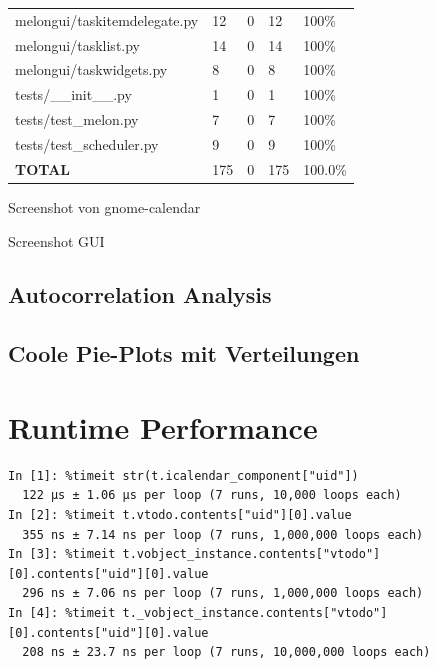 \documentclass{prettytex/ox/mmsc-special-topic}
\begin{document}
\begin{table}[H]
\begin{tabular}{lllll}
      melongui/taskitemdelegate.py    & 12        & 0        & 12        & 100\%     \\
      melongui/tasklist.py            & 14        & 0        & 14        & 100\%     \\
      melongui/taskwidgets.py         & 8         & 0        & 8         & 100\%     \\
      tests/\_\_init\_\_.py           & 1         & 0        & 1         & 100\%     \\
      tests/test\_melon.py            & 7         & 0        & 7         & 100\%     \\
      tests/test\_scheduler.py        & 9         & 0        & 9         & 100\%     \\
      \hline
      \bf TOTAL                       & 175       & 0        & 175       & 100.0\%   \\
      \hline
    \end{tabular}
  \end{table}

  Screenshot von gnome-calendar

  Screenshot GUI

  \subsection{Autocorrelation Analysis}
  \subsection{Coole Pie-Plots mit Verteilungen}

  \section{Runtime Performance}
  \begin{verbatim}
In [1]: %timeit str(t.icalendar_component["uid"])
  122 µs ± 1.06 µs per loop (7 runs, 10,000 loops each)
In [2]: %timeit t.vtodo.contents["uid"][0].value
  355 ns ± 7.14 ns per loop (7 runs, 1,000,000 loops each)
In [3]: %timeit t.vobject_instance.contents["vtodo"][0].contents["uid"][0].value
  296 ns ± 7.06 ns per loop (7 runs, 1,000,000 loops each)
In [4]: %timeit t._vobject_instance.contents["vtodo"][0].contents["uid"][0].value
  208 ns ± 23.7 ns per loop (7 runs, 10,000,000 loops each)
  \end{verbatim}
\end{document}
